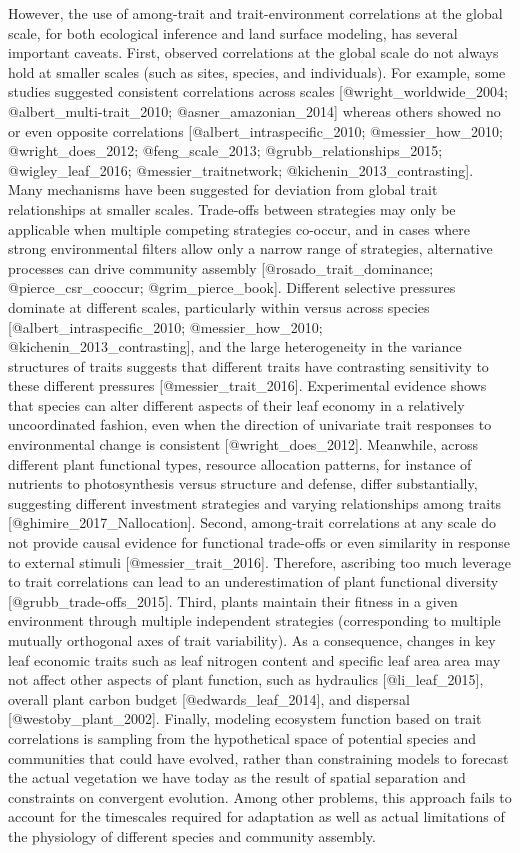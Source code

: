 However, the use of among-trait and trait-environment correlations at the global scale, for both ecological inference and land surface modeling, has several important caveats.
First, observed correlations at the global scale do not always hold at smaller scales (such as sites, species, and individuals).
For example, some studies suggested consistent correlations across scales [@wright_worldwide_2004; @albert_multi-trait_2010; @asner_amazonian_2014]
whereas others showed no or even opposite correlations [@albert_intraspecific_2010; @messier_how_2010; @wright_does_2012; @feng_scale_2013; @grubb_relationships_2015; @wigley_leaf_2016; @messier_traitnetwork; @kichenin_2013_contrasting].
Many mechanisms have been suggested for deviation from global trait relationships at smaller scales.
Trade-offs between strategies may only be applicable when multiple competing strategies co-occur, and in cases where strong environmental filters allow only a narrow range of strategies, alternative processes can drive community assembly [@rosado_trait_dominance; @pierce_csr_cooccur; @grim_pierce_book].
Different selective pressures dominate at different scales, particularly within versus across species [@albert_intraspecific_2010; @messier_how_2010; @kichenin_2013_contrasting],
and the large heterogeneity in the variance structures of traits suggests that different traits have contrasting sensitivity to these different pressures [@messier_trait_2016].
Experimental evidence shows that species can alter different aspects of their leaf economy in a relatively uncoordinated fashion, even when the direction of univariate trait responses to environmental change is consistent [@wright_does_2012].
Meanwhile, across different plant functional types, resource allocation patterns, for instance of nutrients to photosynthesis versus structure and defense, differ substantially, suggesting different investment strategies and varying relationships among traits [@ghimire_2017_Nallocation].
Second, among-trait correlations at any scale do not provide causal evidence for functional trade-offs or even similarity in response to external stimuli [@messier_trait_2016].
Therefore, ascribing too much leverage to trait correlations can lead to an underestimation of plant functional diversity [@grubb_trade-offs_2015].
Third, plants maintain their fitness in a given environment through multiple independent strategies (corresponding to multiple mutually orthogonal axes of trait variability).
As a consequence, changes in key leaf economic traits such as leaf nitrogen content and specific leaf area area may not affect other aspects of plant function, such as
hydraulics [@li_leaf_2015],
overall plant carbon budget [@edwards_leaf_2014],
and dispersal [@westoby_plant_2002].
Finally, modeling ecosystem function based on trait correlations is sampling from the hypothetical space of potential species and communities that could have evolved, rather than constraining models to forecast the actual vegetation we have today as the result of spatial separation and constraints on convergent evolution.
Among other problems, this approach fails to account for the timescales required for adaptation as well as actual limitations of the physiology of different species and community assembly.

